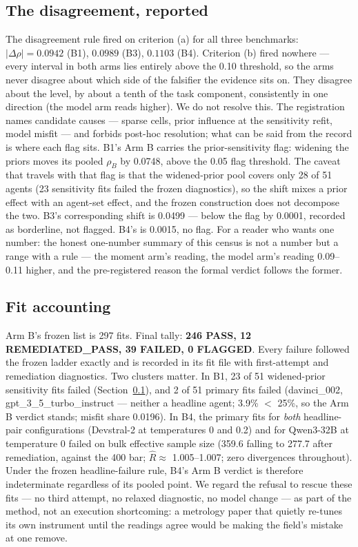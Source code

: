 \documentclass[11pt]{article}
\begin{document}
\subsection{The disagreement, reported}
\label{sec:discord}

The disagreement rule fired on criterion (a) for all three benchmarks:
$|\Delta\rho| = 0.0942$ (B1), $0.0989$ (B3), $0.1103$ (B4). Criterion
(b) fired nowhere --- every interval in both arms lies entirely above
the 0.10 threshold, so the arms never disagree about which side of the
falsifier the evidence sits on. They disagree about the level, by
about a tenth of the task component, consistently in one direction
(the model arm reads higher). We do not resolve this. The
registration names candidate causes --- sparse cells, prior influence
at the sensitivity refit, model misfit --- and forbids post-hoc
resolution; what can be said from the record is where each flag sits.
B1's Arm B carries the prior-sensitivity flag: widening the priors
moves its pooled $\rho_B$ by 0.0748, above the 0.05 flag threshold.
The caveat that travels with that flag is that the widened-prior pool
covers only 28 of 51 agents (23 sensitivity fits failed the frozen
diagnostics), so the shift mixes a prior effect with an agent-set
effect, and the frozen construction does not decompose the two. B3's
corresponding shift is 0.0499 --- below the flag by 0.0001, recorded
as borderline, not flagged. B4's is 0.0015, no flag. For a reader who
wants one number: the honest one-number summary of this census is not
a number but a range with a rule --- the moment arm's reading, the
model arm's reading 0.09--0.11 higher, and the pre-registered reason
the formal verdict follows the former.

\subsection{Fit accounting}
\label{sec:fits}

Arm B's frozen list is 297 fits. Final tally: \textbf{246 PASS, 12
REMEDIATED\_PASS, 39 FAILED, 0 FLAGGED}. Every failure followed the
frozen ladder exactly and is recorded in its fit file with
first-attempt and remediation diagnostics. Two clusters matter. In
B1, 23 of 51 widened-prior sensitivity fits failed (Section~\ref{sec:discord}),
and 2 of 51 primary fits failed (davinci\_002,
gpt\_3\_5\_turbo\_instruct --- neither a headline agent; 3.9\% $<$
25\%, so the Arm B verdict stands; misfit share 0.0196). In B4, the
primary fits for \emph{both} headline-pair configurations
(Devstral-2 at temperatures 0 and 0.2) and for Qwen3-32B at
temperature 0 failed on bulk effective sample size (359.6 falling to
277.7 after remediation, against the 400 bar; $\hat{R} \approx$
1.005--1.007; zero divergences throughout). Under the frozen
headline-failure rule, B4's Arm B verdict is therefore indeterminate
regardless of its pooled point. We regard the refusal to rescue these
fits --- no third attempt, no relaxed diagnostic, no model change ---
as part of the method, not an execution shortcoming: a metrology
paper that quietly re-tunes its own instrument until the readings
agree would be making the field's mistake at one remove.
\end{document}
